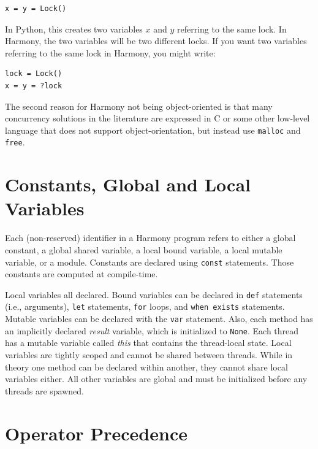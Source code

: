 \documentclass{report}
\newenvironment{code}{
\tcolorbox
}{
\endtcolorbox
}
\begin{document}
\begin{code}
\begin{verbatim}
x = y = Lock()
\end{verbatim}
\end{code}

In Python, this creates two variables $x$ and $y$ referring to the same lock.
In Harmony, the two variables will be two different locks.  If you want two
variables referring to the same lock in Harmony, you might write:

\begin{code}
\begin{verbatim}
lock = Lock()
x = y = ?lock
\end{verbatim}
\end{code}

The second reason for Harmony not being object-oriented is that
many concurrency solutions in the literature are
expressed in C or some other low-level language that does not support
object-orientation, but instead use \texttt{malloc} and \texttt{free}.

\section{Constants, Global and Local Variables}\label{sec:vars}

Each (non-reserved) identifier in a Harmony program refers to either
a global constant, a global shared variable, a local bound variable,
a local mutable variable, or a module.
Constants are declared using \texttt{const} statements.
Those constants are computed at compile-time.

Local variables all declared.
Bound variables can be declared in
\texttt{def} statements (i.e., arguments),
\texttt{let} statements, \texttt{for} loops, and \texttt{when exists} statements.
Mutable variables can be declared with the \texttt{var} statement.
Also, each method has an implicitly declared
\textit{result} variable, which is initialized to \texttt{None}.
Each thread has a mutable variable called \textit{this} that contains
the thread-local state.
Local variables are tightly scoped and cannot be shared
between threads.
While in theory one method can be declared within another,
they cannot share local variables either.
All other variables are global and must be initialized
before any threads are spawned.

\section{Operator Precedence}
\end{document}
